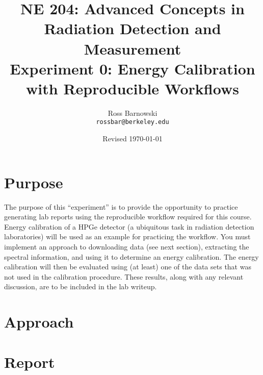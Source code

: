 \documentclass[11pt]{article}
\title{%
       NE 204: Advanced Concepts in Radiation Detection and \\ Measurement \\
       \Large\bf Experiment 0: Energy Calibration with Reproducible Workflows}
\author{Ross Barnowski \\ {\tt rossbar@berkeley.edu}}
\date{Revised \today}
\begin{document}
\maketitle

\section*{Purpose}

The purpose of this ``experiment'' is to provide the opportunity to practice 
generating lab reports using the reproducible workflow required for this
course. 
Energy calibration of a HPGe detector (a ubiquitous task in radiation detection
laboratories) will be used as an example for practicing the workflow.
You must implement an approach to downloading data (see next section), 
extracting the spectral information, and using it to determine an energy 
calibration. 
The energy calibration will then be evaluated using (at least) one of the data
sets that was not used in the calibration procedure.
These results, along with any relevant discussion, are to be included in the
lab writeup.

\section*{Approach}

\section*{Report}
\end{document}

